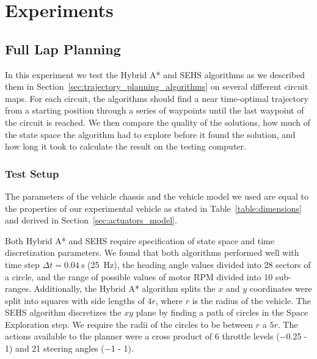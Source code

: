 \chapter{Experiments}
\label{chapter:experiments}

\section{Full Lap Planning}

In this experiment we test the Hybrid A* and \gls{SEHS} algorithms as we described them in Section~\ref{sec:trajectory_planning_algorithms} on several different circuit maps. For each circuit, the algorithms should find a near time-optimal trajectory from a starting position through a series of waypoints until the last waypoint of the circuit is reached. We then compare the quality of the solutions, how much of the state space the algorithm had to explore before it found the solution, and how long it took to calculate the result on the testing computer.

\subsection{Test Setup}

The parameters of the vehicle chassis and the vehicle model we used are equal to the properties of our experimental vehicle as stated in Table~\ref{table:dimensions} and derived in Section~\ref{sec:actuators_model}.

Both Hybrid A* and \gls*{SEHS} require specification of state space and time discretization parameters. We found that both algorithms performed well with time step $\Delta t=\SI{0.04}{\second}$ (\SI{25}{\hertz}), the heading angle values divided into \num{28} sectors of a circle, and the range of possible values of motor \gls*{RPM} divided into \num{10} sub-ranges. Additionally, the Hybrid A* algorithm splits the $x$ and $y$ coordinates were split into squares with side lengths of $4r$, where $r$ is the radius of the vehicle. The SEHS algorithm discretizes the $xy$ plane by finding a path of circles in the Space Exploration step. We require the radii of the circles to be between $r$ a $5r$. The actions available to the planner were a cross product of 6 throttle levels (\num{-0.25} - \num{1}) and 21 steering angles (\num{-1} - \num{1}).

